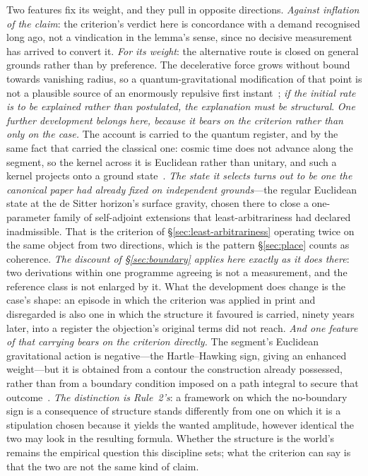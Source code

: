 \documentclass[11pt,a4paper]{article}
\begin{document}
Two features fix its weight, and they pull in opposite directions. \emph{Against inflation of the claim}: the criterion's verdict here is concordance with a demand recognised long ago, not
a vindication in the lemma's sense, since no decisive measurement has arrived to convert it. \emph{For its
weight}: the alternative route is closed on general grounds rather than by preference. The decelerative force
grows without bound towards vanishing radius, so a quantum-gravitational modification of that point is not a
plausible source of an enormously repulsive first instant~\cite{JanzenEinsteinConsiderations}; \emph{if the
initial rate is to be explained rather than postulated, the explanation must be structural}. \emph{One further development belongs here, because it bears on the criterion rather than only on the case.}
The account is carried to the quantum register, and by the same fact that carried the classical
one: cosmic time does not advance along the segment, so the kernel across it is Euclidean rather than unitary,
and such a kernel projects onto a ground state~\cite{JanzenCanonicalTime}. \emph{The state it selects turns out
to be one the canonical paper had already fixed on independent grounds}---the regular Euclidean state at the de
Sitter horizon's surface gravity, chosen there to close a one-parameter family of self-adjoint extensions that
least-arbitrariness had declared inadmissible. That is the criterion of \S\ref{sec:least-arbitrariness}
operating twice on the same object from two directions, which is the pattern \S\ref{sec:place} counts as
coherence. \emph{The discount of \S\ref{sec:boundary} applies here exactly as it does there}: two derivations
within one programme agreeing is not a measurement, and the reference class is not enlarged by it. What the
development does change is the case's shape: an episode in which the criterion was applied in print and
disregarded is also one in which the structure it favoured is carried, ninety years later, into a register the
objection's original terms did not reach. \emph{And one feature of that carrying bears on the criterion directly.} The segment's Euclidean gravitational action is negative---the Hartle--Hawking sign, giving an enhanced weight---but it is obtained from a contour the construction already possessed, rather than from a boundary condition imposed on a path integral to secure that outcome~\cite{JanzenCanonicalTime}. \emph{The distinction is Rule~2's}: a framework on which the no-boundary sign is a consequence of structure stands differently from one on which it is a stipulation chosen because it yields the wanted amplitude, however identical the two may look in the resulting formula. Whether the structure is the world's remains the empirical question this discipline sets; what the criterion can say is that the two are not the same kind of claim.
\end{document}
